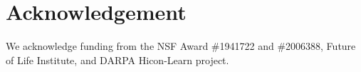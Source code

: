 \documentclass[letterpaper, 10 pt, conference]{ieeeconf}  %
\theoremstyle{exampstyle}
\begin{document}





\clearpage
\section*{Acknowledgement}
We acknowledge funding from the NSF Award \#1941722 and \#2006388, Future of Life Institute, and DARPA Hicon-Learn project.

\balance


\end{document}
